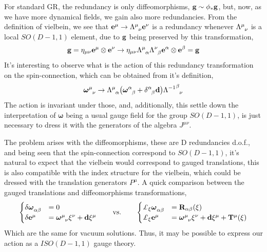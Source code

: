 \documentclass[a0,portrait]{a0poster}
\begin{document}
\begin{multicols}{2}
For standard GR, the redundancy is only diffeomorphisms, $\vb g\sim \phi_\ast \vb g$, but, now, as we have more dynamical fields, we gain 
also more redundancies. From the definition of vielbein, we see that $\vb e^\mu\rightarrow \tensor{\Lambda}{^\mu_\nu}\vb e^\nu$ is a redundancy 
whenever $\tensor{\Lambda}{^\mu_\nu}$ is a local $SO(D-1,1)$ element, due to $\vb g$ being preserved by this transformation,
\[\vb g=\eta_{\mu\nu}\vb e^\mu\otimes\vb e^\nu\rightarrow \eta_{\mu\nu}\tensor{\Lambda}{^\mu_\alpha}\tensor{\Lambda}{^\nu_\beta}\vb e^\alpha\otimes\vb e^\beta=\vb g\]
It's interesting to observe what is the action of this redundancy transformation on the spin-connection, which can be obtained from it's 
definition,
\[\tensor{{\boldsymbol\omega}}{^\mu_\nu}\rightarrow \tensor{\Lambda}{^\mu_\alpha}\qty(\tensor{{\boldsymbol\omega}}{^\alpha_\beta}+\tensor{\delta}{^\alpha_\beta}\vb d)\tensor{{\Lambda^{-1}}}{^\beta_\nu}\]
The action is invariant under those, and, additionally, this settle down the interpretation of $\boldsymbol\omega$ being a usual gauge field 
for the group $SO(D-1,1)$, is just necessary to dress it with the generators of the algebra $J^{\mu\nu}$.

The problem arises with the diffeomorphisms, these are D redundancies d.o.f., and being seen that the spin-connection correspond to $SO(D-1,1)$, 
it's natural to expect that the vielbein would correspond to gauged translations, this is also compatible with the index structure for the 
vielbein, which could be dressed with the translation generators $P^\mu$. A quick comparison between the gauged translations and diffeomorphisms 
transformations,
\begin{align*}
    \begin{cases}
        \delta\tensor{{\boldsymbol\omega}}{_\alpha_\beta}&=0\\
        \delta\vb e^\mu&=\tensor{{\boldsymbol\omega}}{^\mu_\nu}\xi^\nu+\vb d\xi^\mu
    \end{cases}\ \ \ \ \ \ \textnormal{vs.}\ \ \ \ \ \  \begin{cases}
        \pounds_\xi\tensor{{\boldsymbol\omega}}{_\alpha_\beta}&=\vb R_{\alpha\beta}\qty(\xi)\\
        \pounds_\xi\vb e^\mu&=\tensor{{\boldsymbol\omega}}{^\mu_\nu}\xi^\nu+\vb d\xi^\mu+\vb T^\mu\qty(\xi)
    \end{cases}
\end{align*}
Which are the same for vacuum solutions. Thus, it may be possible to express our action as a $ISO(D-1,1)$ gauge theory.


\end{multicols}
\end{document}
